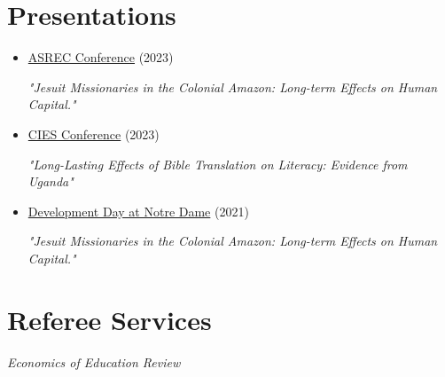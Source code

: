 \documentclass[letterpaper,11pt]{article}
\begin{document}
\section{Presentations}
\begin{adjustwidth}{3mm}{0mm}
  \begin{itemize}
    \item \href{http://www.asrec.org/conferences/}{ASREC Conference} (2023) 
    
    \textit{"Jesuit Missionaries in the Colonial Amazon: Long-term Effects on Human Capital."}
  \end{itemize}

  \begin{itemize}
    \item \href{https://cies2023.org/}{CIES Conference} (2023) 
    
    \textit{"Long-Lasting Effects of Bible Translation on Literacy: Evidence from Uganda"}
  \end{itemize}

  \begin{itemize}
    \item \href{https://kellogg.nd.edu/development-day-2021#tab-2998}{Development Day at Notre Dame} (2021) 
    
    \textit{"Jesuit Missionaries in the Colonial Amazon: Long-term Effects on Human Capital."}
  \end{itemize}
\end{adjustwidth}

\section{Referee Services}
\begin{adjustwidth}{3mm}{0mm}
\textit{Economics of Education Review}
\end{adjustwidth}
\end{document}
